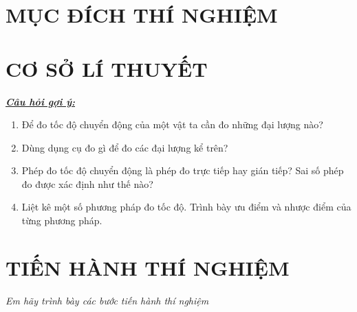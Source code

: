 \section{MỤC ĐÍCH THÍ NGHIỆM}
\Pointilles[2]
\section{CƠ SỞ LÍ THUYẾT}
\textit{\textbf{\underline{Câu hỏi gợi ý:}}}\\
\begin{enumerate}[label=\bfseries Câu \arabic*., leftmargin=2cm]
	\item Để đo tốc độ chuyển động của một vật ta cần đo những đại lượng nào?
	\item Dùng dụng cụ đo gì để đo các đại lượng kể trên?
	\item Phép đo tốc độ chuyển động là phép đo trực tiếp hay gián tiếp? Sai số phép đo được xác định như thế nào?
	\item Liệt kê một số phương pháp đo tốc độ. Trình bày ưu điểm và nhược điểm của từng phương pháp.
\end{enumerate}
\Pointilles[20]
\section{TIẾN HÀNH THÍ NGHIỆM}
\textit{Em hãy trình bày các bước tiến hành thí nghiệm}\\
\Pointilles[23]
